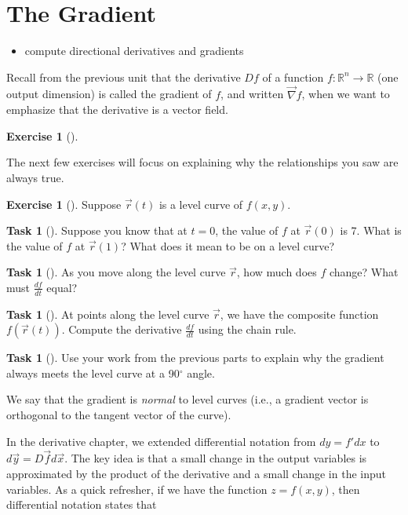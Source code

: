 \documentclass[10pt,]{book}
\theoremstyle{plain}
\theoremstyle{definition}
\theoremstyle{definition}
\theoremstyle{definition}
\theoremstyle{definition}
\newtheorem{exploration}[project]{Exercise}
\newtheorem{task}[project]{Task}
\theoremstyle{definition}
\numberwithin{equation}{section}
\newcommand{\ds}{\displaystyle}
\begin{document}
\section[{The Gradient}]{The Gradient}\label{section-34}
\leavevmode%
\begin{itemize}[label=\textbullet]
\item{}compute directional derivatives and gradients%
\end{itemize}
Recall from the previous unit that the derivative \(Df\) of a function \(f:\mathbb{R}^n\to\mathbb{R}\) (one output dimension) is called the gradient of \(f\), and written \(\vec \nabla f\), when we want to emphasize that the derivative is a vector field.%
\begin{exploration}[]\label{exploration-224}
\end{exploration}
The next few exercises will focus on explaining why the relationships you saw are always true.%
\begin{exploration}[]\label{exploration-225}
Suppose \(\vec r(t)\) is a level curve of \(f(x,y)\).%
\begin{task}[]\label{task-589}
Suppose you know that at \(t=0\), the value of \(f\) at \(\vec r(0)\) is 7.  What is the value of \(f\) at \(\vec r(1)\)? What does it mean to be on a level curve?%
%
\end{task}
\begin{task}[]\label{task-590}
As you move along the level curve \(\vec r\), how much does \(f\) change?  What must \(\ds\frac{df}{dt}\) equal?%
\end{task}
\begin{task}[]\label{task-591}
At points along the level curve \(\vec r\), we have the composite function \(f(\vec r(t))\).  Compute the derivative \(\ds\frac{df}{dt}\) using the chain rule.%
\end{task}
\begin{task}[]\label{task-592}
Use your work from the previous parts to explain why the gradient always meets the level curve at a 90\(^\circ\) angle.%
\end{task}
We say that the gradient is \emph{normal} to level curves (i.e., a gradient vector is orthogonal to the tangent vector of the curve).%
\end{exploration}
In the derivative chapter, we extended differential notation from \(dy=f' dx\) to \(d\vec y = D\vec f d\vec x\). The key idea is that a small change in the output variables is approximated by the product of the derivative and a small change in the input variables. As a quick refresher, if we have the function \(z=f(x,y)\), then differential notation states that%
\end{document}
